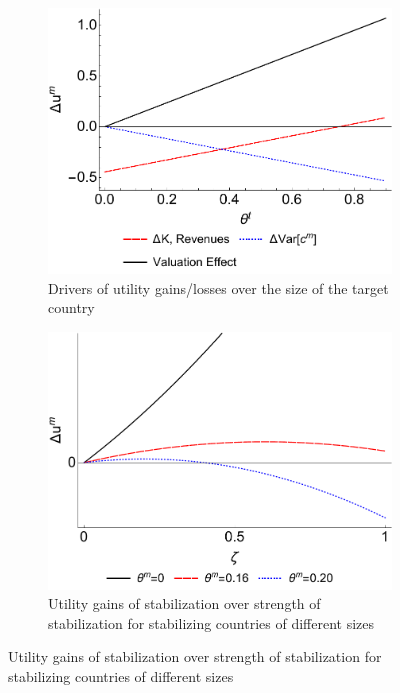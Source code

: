 \documentclass[12pt,letter]{article}
\theoremstyle{break} \theorembodyfont{\normalfont\itshape}
\theoremstyle{break}
\theoremstyle{break} \theorembodyfont{\normalfont\itshape}
\theoremstyle{break} \theorembodyfont{\normalfont\itshape}
\begin{document}
\clearpage

\begin{figure}[!ht]
  \begin{minipage}{\linewidth}
    \begin{centering}
      \caption{Effect of Stabilization on Utility in the Stabilizing
        Country}\label{fig_welfare}
      \begin{subfigure}{.6\textwidth}
        \caption{Drivers of utility gains/losses over the size of the
          target country}
        \includegraphics[width=\textwidth]{./Figures/Figure_Welfare_TgtSize.pdf}
      \end{subfigure}

      \bigskip


      \begin{subfigure}{.6\textwidth}
        \caption{{Utility gains of stabilization over strength of
            stabilization for stabilizing countries of different
            sizes}}
        \includegraphics[width=\textwidth]{./Figures/Figure_Welfare_ThreeSizes.pdf}
      \end{subfigure}


\end{centering}
\end{minipage}
\end{figure}
\end{document}
